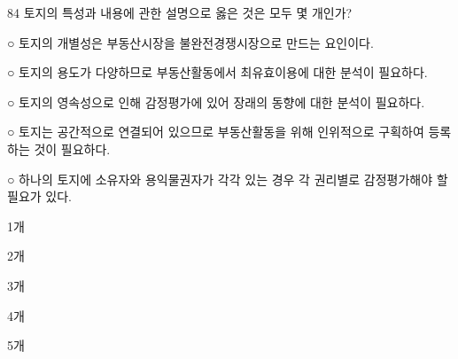 \begin{question}{84}
토지의 특성과 내용에 관한 설명으로 옳은 것은 모두 몇 개인가?
\begin{framedtext}
○ 토지의 개별성은 부동산시장을 불완전경쟁시장으로 만드는 요인이다. \par
○ 토지의 용도가 다양하므로 부동산활동에서 최유효이용에 대한 분석이 필요하다. \par
○ 토지의 영속성으로 인해 감정평가에 있어 장래의 동향에 대한 분석이 필요하다. \par
○ 토지는 공간적으로 연결되어 있으므로 부동산활동을 위해 인위적으로 구획하여 등록하는 것이 필요하다. \par
○ 하나의 토지에 소유자와 용익물권자가 각각 있는 경우 각 권리별로 감정평가해야 할 필요가 있다. \par
\end{framedtext}
\begin{choices}
  \item 1개
  \item 2개
  \item 3개
  \item 4개
  \item 5개
\end{choices}
\end{question}
